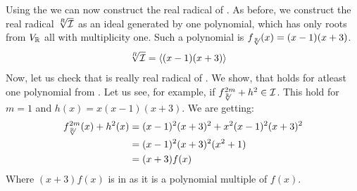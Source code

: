 \begin{example}
  Using the  we can now construct the real radical of \Ideal{}.
  As before, we construct the real radical $\sqrt[R]{\mathcal{I}}{}$ as an ideal generated by one polynomial, which has only roots from $V_{\mathbb{R}}$ all with multiplicity one.
  Such a polynomial is $f_{\sqrt[\mathbb{R}]{}}(x) = (x-1)(x+3)$.
  \begin{align}
    \sqrt[R]{\mathcal{I}} &= \langle(x-1)(x+3) \rangle
  \end{align}
  Now, let us check that \rrIdeal{} is really real radical of \Ideal.
  We show, that  holds for atleast one polynomial from \rrIdeal.
  Let us see, for example, if $f_{\sqrt[\mathbb{R}]{}}^{2m} + h^2 \in \mathcal{I}$.
  This hold for $m = 1$ and $h(x) = x(x-1)(x+3)$.
  We are getting:
  \begin{align}
    f_{\sqrt[\mathbb{R}]{}}^{2m}(x) + h^2(x) &= (x-1)^2(x+3)^2 + x^2(x-1)^2(x+3)^2\\
    &= (x-1)^2(x+3)^2(x^2+1)\\
    &= (x+3)f(x)
  \end{align}
  Where $(x+3)f(x)$ is in \Ideal{} as it is a polynomial multiple of $f(x)$.

\end{example}

